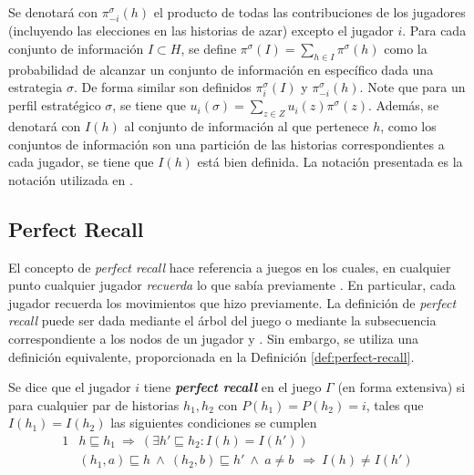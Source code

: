 Se denotará con $\pi^{\sigma}_{-i}(h)$ el producto de todas las contribuciones de los jugadores (incluyendo las elecciones en las historias de azar) excepto el jugador $i$. Para cada conjunto de información  $I \subset H$, se define $\pi^{\sigma}(I) = \sum_{h \in I} \pi^\sigma(h)$ como la probabilidad de alcanzar un conjunto de información en específico dada una estrategia $\sigma$. De forma similar son definidos $\pi^\sigma_i(I)$ y $\pi^\sigma_{-i}(h)$. Note que para un perfil estratégico $\sigma$, se tiene que $u_i(\sigma) = \sum_{z \in Z} u_i(z)\pi^{\sigma}(z)$. Además, se denotará con $I(h)$ al conjunto de información al que pertenece $h$, como los conjuntos de información son una partición de las historias correspondientes a cada jugador, se tiene que $I(h)$ está bien definida. La notación presentada es la notación utilizada en \cite{bib:cfr}.

\subsection{Perfect Recall}

El concepto de \textit{perfect recall} hace referencia a juegos en los cuales, en cualquier punto cualquier jugador \textit{recuerda} lo que sabía previamente \cite[p.~203]{bib:course-game-theory}. En particular, cada jugador recuerda los movimientos que hizo previamente. La definición de \textit{perfect recall} puede ser dada mediante el árbol del juego \cite{bib:conceptos-basicos} o mediante la subsecuencia correspondiente a los nodos de un jugador \cite[p.~203]{bib:course-game-theory} y \cite[p.~44]{bib:handbook-blai}. Sin embargo, se utiliza una definición equivalente, proporcionada en la Definición \ref{def:perfect-recall}.

\begin{definition}
\label{def:perfect-recall}
Se dice que el jugador $i$ tiene \textbf{\textit{perfect recall}} en el juego $\Gamma$ (en forma extensiva) si para cualquier par de historias $h_1, h_2$ con $P(h_1) = P(h_2) = i$, tales que $I(h_1) = I(h_2)$ las siguientes condiciones se cumplen
\begin{alignat}{1}
& h \sqsubseteq h_1\ \Rightarrow\ (\exists h' \sqsubseteq h_2 : I(h) = I(h') )
\label{eq:condicion-1}\\
& (h_1, a) \sqsubseteq h\  \land\ (h_2, b)\sqsubseteq h'\ \land\ a \neq b\ \  \Rightarrow\ I(h) \neq I(h')
\label{eq:condicion-2}
\end{alignat}
\end{definition}


